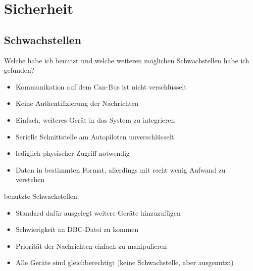 \chapter{Sicherheit}

\section{Schwachstellen}
Welche habe ich benutzt und welche weiteren möglichen Schwachstellen habe ich gefunden?
\begin{itemize}
    \item Kommunikation auf dem Can-Bus ist nicht verschlüsselt
    \item Keine Authentifizierung der Nachrichten
    \item Einfach, weiteres Gerät in das System zu integrieren
    \item Serielle Schnittstelle am Autopiloten unverschlüsselt
    \item lediglich physischer Zugriff notwendig
    \item Daten in bestimmten Format, allerdings mit recht wenig Aufwand zu verstehen
\end{itemize}
benutzte Schwachstellen:
\begin{itemize}
    \item Standard dafür ausgelegt weitere Geräte hinzuzufügen
    \item Schwierigkeit an DBC-Datei zu kommen
    \item Priorität der Nachrichten einfach zu manipulieren
    \item Alle Geräte sind gleichberechtigt (keine Schwachstelle, aber ausgenutzt)
\end{itemize}

